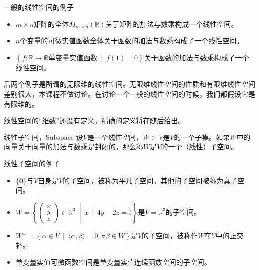 \documentclass[10pt]{beamer}
\begin{document}

\begin{frame}

\begin{block}{一般的线性空间的例子}
\begin{itemize}
\item $m\times n$矩阵的全体$M_{m\times n}(\mathbb{R})$关于矩阵的加法与数乘构成一个线性空间。
\item $n$个变量的可微实值函数全体关于函数的加法与数乘构成了一个线性空间。
\item $\left\{ f: \mathbb{R} \to \mathbb{R} \text{单变量实值函数} \ \middle|\ f(1) = 0 \right\}$关于函数的加法与数乘构成了一个线性空间。
\end{itemize}
\end{block}

\vspace{1em}
\pause

后两个例子是所谓的无限维的线性空间。无限维线性空间的性质和有限维线性空间差别很大，本课程不做讨论。在讨论一个一般的线性空间的时候，我们都假设它是有限维的。

\vspace{1em}
\pause

线性空间的``维数''还没有定义，精确的定义将在随后给出。

\end{frame}


\begin{frame}

\begin{block}{线性子空间，Subspace}
设$V$是一个线性空间，$W \subset V$是$V$的一个子集。如果$W$中的向量关于向量的加法与数乘是封闭的，那么称$W$是$V$的一个（线性）子空间。
\end{block}

\begin{block}{线性子空间的例子}
\begin{itemize}
\item $\{\mathbf{0}\}$与$V$自身是$V$的子空间，被称为平凡子空间。其他的子空间被称为真子空间。
\item \(\displaystyle W = \left\{ \begin{pmatrix}
x \\ y \\ z\end{pmatrix} \in \mathbb{R}^3 \ \middle| \ x + 4y -2z = 0\right\} \)是$V = \mathbb{R}^3$的子空间。
\item \(\displaystyle W^{\perp} = \left\{ \alpha \in V \ \middle| \ \langle \alpha, \beta \rangle = 0, \forall \beta \in W \right\} \)是$V$的子空间，被称作$W$在$V$中的正交补。
\item 单变量实值可微函数空间是单变量实值连续函数空间的子空间。
\end{itemize}
\end{block}

\end{frame}
\end{document}
